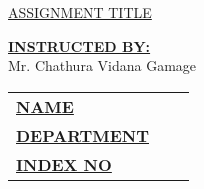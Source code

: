 \documentclass[12pt,a4paper]{article}
\begin{document}
\begin{titlepage}
	
	
	\begin{flushright}
		\textbf{\uppercase{\fontsize{12}{18} \selectfont {Assignment No: 01}}}
	\end{flushright}
	
	
	
	
	
	
	\vspace*{\fill}
	\begin{center}
		\uppercase{\fontsize{30}{45}\selectfont \ul{Assignment Title}}
	\end{center}
	\vfill %
	
	
	\begin{multicols}{2}
		
		\noindent\textbf{\underline{INSTRUCTED BY:}} \\Mr. Chathura Vidana Gamage
		
		
		\columnbreak
		
		
		
		\begin{tabular}{lll}
			\vspace{6pt}
			
			\textbf{\uppercase{\underline{Name}}}       & \textbf{\uppercase{\fontsize{12}{18} \selectfont {:}}} {\fontsize{12}{18} \selectfont {<Name>}}        \\
			
			\vspace{6pt}
			\textbf{\uppercase{\underline{Department}}} & \textbf{\uppercase{\fontsize{12}{18} \selectfont {:}}} {\fontsize{12}{18} \selectfont {<Department>}}       \\
			
			\vspace{6pt}
			\textbf{\uppercase{\underline{Index No}}}   & \textbf{\uppercase{\fontsize{12}{18} \selectfont {:}}} {\fontsize{12}{18} \selectfont {<Index No>}}          \\

			
			
		\end{tabular}
	\end{multicols}
	
\end{titlepage}
\end{document}
